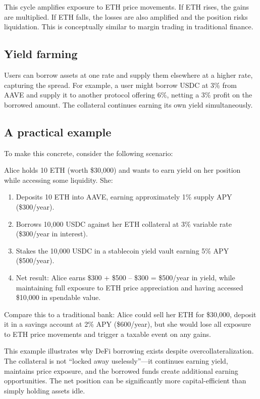 This cycle amplifies exposure to ETH price movements. If ETH rises, the gains are multiplied. If ETH falls, the losses are also amplified and the position risks liquidation. This is conceptually similar to margin trading in traditional finance.

\subsection{Yield farming}

Users can borrow assets at one rate and supply them elsewhere at a higher rate, capturing the spread. For example, a user might borrow USDC at 3\% from AAVE and supply it to another protocol offering 6\%, netting a 3\% profit on the borrowed amount. The collateral continues earning its own yield simultaneously.

\subsection{A practical example}

To make this concrete, consider the following scenario:

Alice holds 10 ETH (worth \$30,000) and wants to earn yield on her position while accessing some liquidity. She:

\begin{enumerate}
    \item Deposits 10 ETH into AAVE, earning approximately 1\% supply APY (\$300/year).
    \item Borrows 10,000 USDC against her ETH collateral at 3\% variable rate (\$300/year in interest).
    \item Stakes the 10,000 USDC in a stablecoin yield vault earning 5\% APY (\$500/year).
    \item Net result: Alice earns \$300 + \$500 -- \$300 = \$500/year in yield, while maintaining full exposure to ETH price appreciation and having accessed \$10,000 in spendable value.
\end{enumerate}

Compare this to a traditional bank: Alice could sell her ETH for \$30,000, deposit it in a savings account at 2\% APY (\$600/year), but she would lose all exposure to ETH price movements and trigger a taxable event on any gains.

This example illustrates why DeFi borrowing exists despite overcollateralization. The collateral is not ``locked away uselessly''---it continues earning yield, maintains price exposure, and the borrowed funds create additional earning opportunities. The net position can be significantly more capital-efficient than simply holding assets idle.
